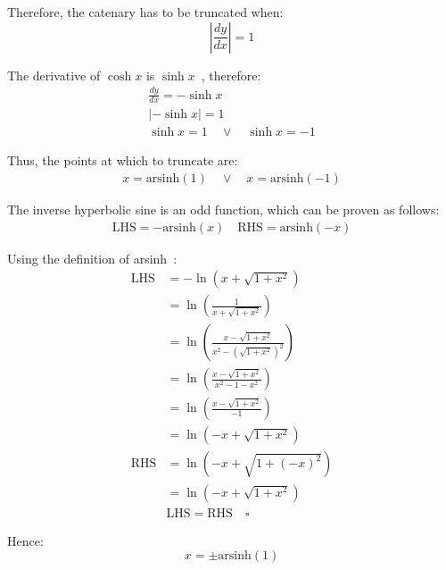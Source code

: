 \documentclass[12pt]{article}
\begin{document}
        Therefore, the catenary has to be truncated when:
        \begin{equation}
            | \frac{dy}{dx} | = 1
        \end{equation}

        The derivative of $\cosh x$ is $\sinh x$~\cite{oxford_dict}, therefore:
        \begin{align}
            \frac{dy}{dx} = - \sinh x \\
            | - \sinh x | = 1 \\
            \sinh x = 1 \quad\lor\quad \sinh x = -1
        \end{align}

        Thus, the points at which to truncate are:
        \begin{align}\label{eq:x_cosh_end}
            x = \text{arsinh}(1) \quad\lor\quad x = \text{arsinh}(-1)
        \end{align}

        The inverse hyperbolic sine is an odd function, which can be proven as follows:
        \begin{align}
            \text{LHS} = -\text{arsinh}(x) \quad \text{RHS} = \text{arsinh}(-x)
        \end{align}

        Using the definition of arsinh~\cite{oxford_dict}:
        \begin{align}
            \text{LHS} &= - \ln(x+\sqrt{1+x^2}) \\
            &= \ln(\frac{1}{x+\sqrt{1+x^2}}) \\
            &= \ln(\frac{x-\sqrt{1+x^2}}{x^2-(\sqrt{1+x^2})^2}) \\
            &= \ln(\frac{x-\sqrt{1+x^2}}{x^2-1-x^2}) \\
            &= \ln(\frac{x-\sqrt{1+x^2}}{-1}) \\ 
            &= \ln(-x+\sqrt{1+x^2}) \\ 
            \text{RHS} &= \ln(-x+\sqrt{1+(-x)^2}) \\
            &= \ln(-x+\sqrt{1+x^2}) \\
            &\text{LHS} = \text{RHS} \quad \square
        \end{align}

        Hence:
        \begin{equation}
            x = \pm \text{arsinh}(1)
        \end{equation} 
\end{document}
